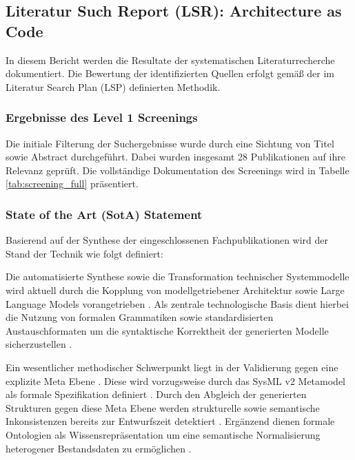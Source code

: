 \subsection{Literatur Such Report (LSR): Architecture as Code}

In diesem Bericht werden die Resultate der systematischen Literaturrecherche dokumentiert. Die Bewertung der identifizierten Quellen erfolgt gemäß der im Literatur Search Plan (LSP) definierten Methodik.

\subsubsection{Ergebnisse des Level 1 Screenings}

Die initiale Filterung der Suchergebnisse wurde durch eine Sichtung von Titel sowie Abstract durchgeführt. Dabei wurden insgesamt 28 Publikationen auf ihre Relevanz geprüft. Die vollständige Dokumentation des Screenings wird in Tabelle \ref{tab:screening_full} präsentiert.

\subsubsection{State of the Art (SotA) Statement}

Basierend auf der Synthese der eingeschlossenen Fachpublikationen wird der Stand der Technik wie folgt definiert:

Die automatisierte Synthese sowie die Transformation technischer Systemmodelle wird aktuell durch die Kopplung von modellgetriebener Architektur sowie Large Language Models vorangetrieben \cite{Pan.2025, Cibrian.2025}. Als zentrale technologische Basis dient hierbei die Nutzung von formalen Grammatiken sowie standardisierten Austauschformaten um die syntaktische Korrektheit der generierten Modelle sicherzustellen \cite{Li.2022, Cafe.2013}.

Ein wesentlicher methodischer Schwerpunkt liegt in der Validierung gegen eine explizite Meta Ebene \cite{Kapos.2014, Cibrian.2025b}. Diese wird vorzugsweise durch das SysML v2 Metamodel als formale Spezifikation definiert \cite{Cibrian.2025b}. Durch den Abgleich der generierten Strukturen gegen diese Meta Ebene werden strukturelle sowie semantische Inkonsistenzen bereits zur Entwurfszeit detektiert \cite{Kapos.2014, Cibrian.2025b}. Ergänzend dienen formale Ontologien als Wissensrepräsentation um eine semantische Normalisierung heterogener Bestandsdaten zu ermöglichen \cite{Meng.2025, Abonyi.2024}.

